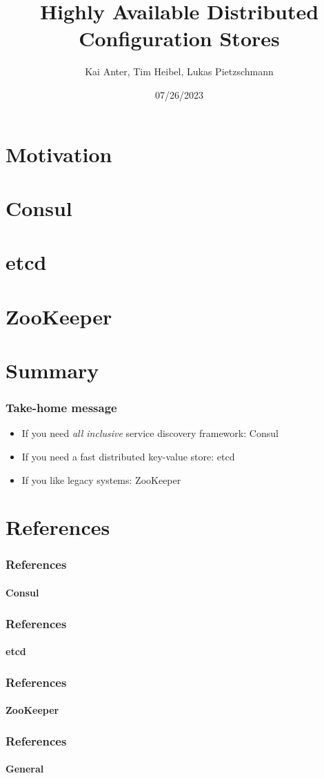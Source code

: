 \documentclass[aspectratio=169, usepdftitle=false]{beamer}
\title[Highly Available Distributed Config Stores]{Highly Available Distributed Configuration Stores}
\author[Kai, Tim, Lukas]{Kai Anter, Tim Heibel, Lukas Pietzschmann}
\subtitle{}
\institute{Institute of Distributed Systems}
\date{07/26/2023}
\begin{document}
\maketitle

\section{Motivation}


\section{Consul}


\section{etcd}


\section{ZooKeeper}


\section{Summary}
\begin{frame}
	\frametitle{Take-home message}
	\begin{itemize}
		\item [\triangleright] If you need \emph{all inclusive} service discovery framework: Consul
		\item [\triangleright] If you need a fast distributed key-value store: etcd
		\item [\triangleright] If you like legacy systems: ZooKeeper
	\end{itemize}
\end{frame}


\section{References}
\begin{frame}[allowframebreaks]
	\frametitle{References}
	\framesubtitle{Consul}
	\printbibliography[keyword={kai}]
\end{frame}
\begin{frame}[allowframebreaks]
	\frametitle{References}
	\framesubtitle{etcd}
	\printbibliography[keyword={tim}]
\end{frame}
\begin{frame}[allowframebreaks]
	\frametitle{References}
	\framesubtitle{ZooKeeper}
	\printbibliography[keyword={lukas}]
\end{frame}
\begin{frame}[allowframebreaks]
	\frametitle{References}
	\framesubtitle{General}
	\printbibliography[keyword={gen}]
\end{frame}
\end{document}
